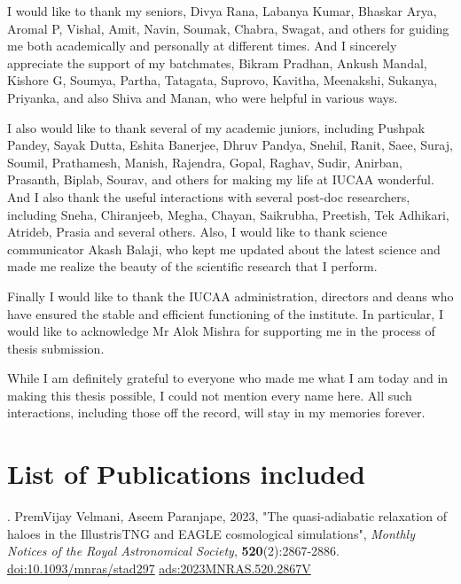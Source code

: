 \documentclass[a4paper, 12pt, oneside]{Thesis}  %
\newcommand{\doi}[1]{\href{https://doi.org/#1}{doi:#1}}
\begin{document}
{I would like to thank my seniors, Divya Rana, Labanya Kumar, Bhaskar Arya, Aromal P, Vishal, Amit, Navin, Soumak, Chabra, Swagat, and others for guiding me both academically and personally at different times. And I sincerely appreciate the support of my batchmates, Bikram Pradhan, Ankush Mandal, Kishore G, Soumya, Partha, Tatagata, Suprovo, Kavitha, Meenakshi, Sukanya, Priyanka, and also Shiva and Manan, who were helpful in various ways.

I also would like to thank several of my academic juniors, including Pushpak Pandey, Sayak Dutta, Eshita Banerjee, Dhruv Pandya, Snehil, Ranit, Saee, Suraj, Soumil, Prathamesh, Manish, Rajendra, Gopal, Raghav, Sudir, Anirban, Prasanth, Biplab, Sourav, and others for making my life at IUCAA wonderful. And I also thank the useful interactions with several post-doc researchers, including Sneha, Chiranjeeb, Megha, Chayan, Saikrubha, Preetish, Tek Adhikari, Atrideb, Prasia and several others.
Also, I would like to thank science communicator Akash Balaji, who kept me updated about the latest science and made me realize the beauty of the scientific research that I perform.

Finally I would like to thank the IUCAA administration, directors and deans who have ensured the stable and efficient functioning of the institute. In particular, I would like to acknowledge Mr Alok Mishra for supporting me in the process of thesis submission.

While I am definitely grateful to everyone who made me what I am today and in making this thesis possible, I could not mention every name here. All such interactions, including those off the record, will stay in my memories forever.

}
\clearpage  %

\pagestyle{fancy}  %

\section*{List of Publications included}

. PremVijay Velmani, Aseem Paranjape, 2023, "The quasi-adiabatic relaxation of haloes in the IllustrisTNG and EAGLE cosmological simulations", \textit{Monthly Notices of the Royal Astronomical Society}, 
\textbf{520}(2):2867-2886. 
\doi{10.1093/mnras/stad297}
\href{https://ui.adsabs.harvard.edu/abs/2023MNRAS.520.2867V}{ads:2023MNRAS.520.2867V}

\vspace{0.5cm}
\end{document}
